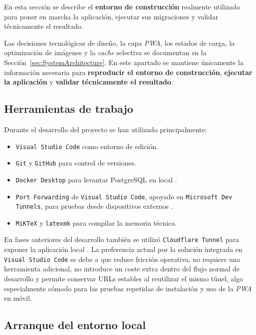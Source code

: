 En esta sección se describe el \textbf{entorno de construcción} realmente utilizado para poner en marcha la aplicación, ejecutar sus migraciones y validar técnicamente el resultado.

Las decisiones tecnológicas de diseño, la capa \textit{PWA}, los estados de carga, la optimización de imágenes y la \textit{cache} selectiva se documentan en la Sección~\ref{sec:SystemArchitecture}. En este apartado se mantiene únicamente la información necesaria para \textbf{reproducir el entorno de construcción}, \textbf{ejecutar la aplicación} y \textbf{validar técnicamente el resultado}.

\subsection{Herramientas de trabajo}

Durante el desarrollo del proyecto se han utilizado principalmente:

\begin{itemize}
    \item \texttt{Visual Studio Code} como entorno de edición.
    \item \texttt{Git} y \texttt{GitHub} para control de versiones.
    \item \texttt{Docker Desktop} para levantar PostgreSQL en local \citep{dockerdocs2026}.
    \item \texttt{Port Forwarding} de \texttt{Visual Studio Code}, apoyado en \texttt{Microsoft Dev Tunnels}, para pruebas desde dispositivos externos \citep{vscodeportforwarding2026,microsoftdevtunnelsfaq2026}.
    \item \texttt{MiKTeX} y \texttt{latexmk} para compilar la memoria técnica.
\end{itemize}

En fases anteriores del desarrollo también se utilizó \texttt{Cloudflare Tunnel} para exponer la aplicación local \citep{cloudflaretunnel2026}. La preferencia actual por la solución integrada en \texttt{Visual Studio Code} se debe a que reduce fricción operativa, no requiere una herramienta adicional, no introduce un coste extra dentro del flujo normal de desarrollo y permite conservar URLs estables al reutilizar el mismo túnel, algo especialmente cómodo para las pruebas repetidas de instalación y uso de la \textit{PWA} en móvil.

\subsection{Arranque del entorno local}

